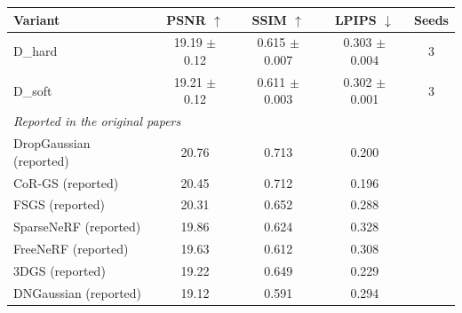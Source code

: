 \begin{tabular}{lcccc}
\toprule
Variant & PSNR $\uparrow$ & SSIM $\uparrow$ & LPIPS $\downarrow$ & Seeds \\
\midrule
D_hard & 19.19 $\pm$ 0.12 & 0.615 $\pm$ 0.007 & 0.303 $\pm$ 0.004 & 3 \\
D_soft & 19.21 $\pm$ 0.12 & 0.611 $\pm$ 0.003 & 0.302 $\pm$ 0.001 & 3 \\
\midrule
\multicolumn{5}{l}{\textit{Reported in the original papers}} \\
DropGaussian (reported) & 20.76 & 0.713 & 0.200 &  \\
CoR-GS (reported) & 20.45 & 0.712 & 0.196 &  \\
FSGS (reported) & 20.31 & 0.652 & 0.288 &  \\
SparseNeRF (reported) & 19.86 & 0.624 & 0.328 &  \\
FreeNeRF (reported) & 19.63 & 0.612 & 0.308 &  \\
3DGS (reported) & 19.22 & 0.649 & 0.229 &  \\
DNGaussian (reported) & 19.12 & 0.591 & 0.294 &  \\
\bottomrule
\end{tabular}
